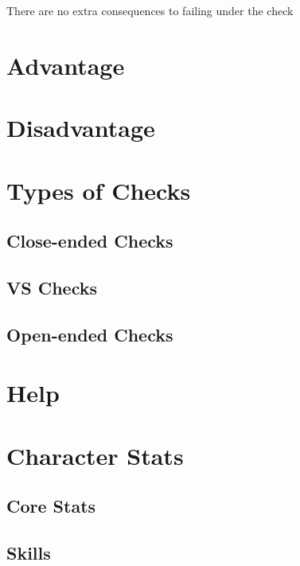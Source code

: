 \documentclass[../main.tex]{subfiles}
\begin{document}
    There are no extra consequences to failing under the check
    
    \section{Advantage}

    \section{Disadvantage}

    \section{Types of Checks}

    \subsection{Close-ended Checks}

    \subsection{VS Checks}

    \subsection{Open-ended Checks}

    \section{Help}

    \section{Character Stats}

    \subsection{Core Stats}

    \subsection{Skills}
\end{document}

